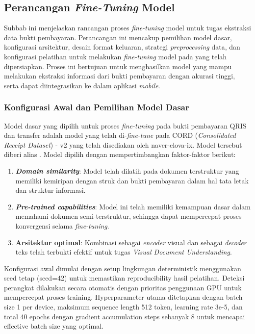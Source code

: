 \subsection{Perancangan \emph{Fine-Tuning} Model \donut}
\label{subsec:perancangan-fine-tuning-model}

Subbab ini menjelaskan rancangan proses \emph{fine-tuning} model \donut{} untuk tugas ekstraksi data bukti pembayaran. Perancangan ini mencakup pemilihan model dasar, konfigurasi arsitektur, desain format keluaran, strategi \emph{preprocessing} data, dan konfigurasi pelatihan untuk melakukan \emph{fine-tuning} model \donut{} pada \dataset{} yang telah dipersiapkan. Proses ini bertujuan untuk menghasilkan model yang mampu melakukan ekstraksi informasi dari bukti pembayaran dengan akurasi tinggi, serta dapat diintegrasikan ke dalam aplikasi \emph{mobile}.

\subsubsection{Konfigurasi Awal dan Pemilihan Model Dasar}
\label{subsubsec:konfigurasi-awal}

Model dasar yang dipilih untuk proses \emph{fine-tuning} pada \dataset{} bukti pembayaran QRIS dan transfer adalah model \donut{} yang telah di-\emph{fine-tune} pada \dataset{} CORD (\emph{Consolidated Receipt Dataset}) - v2 yang telah disediakan oleh naver-clova-ix. Model tersebut diberi alias \donutcord. Model \donutcord{} dipilih dengan mempertimbangkan faktor-faktor berikut:

\begin{enumerate}
    \item \textbf{\emph{Domain similarity}}: Model \donutcord{} telah dilatih pada \dataset{} dokumen terstruktur yang memiliki kemiripan dengan struk dan bukti pembayaran dalam hal tata letak dan struktur informasi.
    \item \textbf{\emph{Pre-trained capabilities}}: Model ini telah memiliki kemampuan dasar dalam memahami dokumen semi-terstruktur, sehingga dapat mempercepat proses konvergensi selama \emph{fine-tuning}.
    \item \textbf{Arsitektur optimal}: Kombinasi \swin{} sebagai \emph{encoder} visual dan \bart{} sebagai \emph{decoder} teks telah terbukti efektif untuk tugas \emph{Visual Document Understanding}.
\end{enumerate}

Konfigurasi awal dimulai dengan setup lingkungan deterministik menggunakan seed tetap (seed=42) untuk memastikan reproducibility hasil pelatihan. Deteksi perangkat dilakukan secara otomatis dengan prioritas penggunaan GPU untuk mempercepat proses training. Hyperparameter utama ditetapkan dengan batch size 1 per device, maksimum sequence length 512 token, learning rate 3e-5, dan total 40 epochs dengan gradient accumulation steps sebanyak 8 untuk mencapai effective batch size yang optimal.


